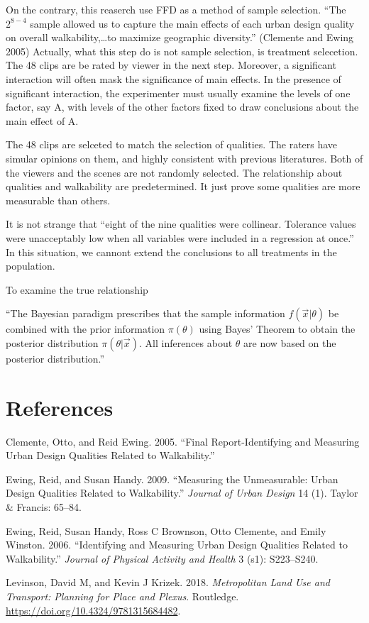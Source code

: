 \documentclass[12pt,]{article}
\begin{document}
On the contrary, this reaserch use FFD as a method of sample selection.
``The \(2^{8-4}\) sample allowed us to capture the main effects of each
urban design quality on overall walkability,\ldots{}to maximize
geographic diversity.'' (Clemente and Ewing 2005) Actually, what this
step do is not sample selection, is treatment selecetion. The 48 clips
are be rated by viewer in the next step. Moreover, a significant
interaction will often mask the significance of main effects. In the
presence of significant interaction, the experimenter must usually
examine the levels of one factor, say A, with levels of the other
factors fixed to draw conclusions about the main effect of A.

The 48 clips are selceted to match the selection of qualities. The
raters have simular opinions on them, and highly consistent with
previous literatures. Both of the viewers and the scenes are not
randomly selected. The relationship about qualities and walkability are
predetermined. It just prove some qualities are more measurable than
others.

It is not strange that ``eight of the nine qualities were collinear.
Tolerance values were unacceptably low when all variables were included
in a regression at once.'' In this situation, we cannont extend the
conclusions to all treatments in the population.

To examine the true relationship

``The Bayesian paradigm prescribes that the sample information
\(f(\vec x|\theta)\) be combined with the prior information
\(\pi(\theta)\) using Bayes' Theorem to obtain the posterior
distribution \(\pi(\theta|\vec x)\). All inferences about \(\theta\) are
now based on the posterior distribution.''

\hypertarget{references}{%
\section*{References}\label{references}}

\hypertarget{refs}{}
\leavevmode\hypertarget{ref-clemente2005identifying}{}%
Clemente, Otto, and Reid Ewing. 2005. ``Final Report-Identifying and
Measuring Urban Design Qualities Related to Walkability.''

\leavevmode\hypertarget{ref-ewing2009measuring}{}%
Ewing, Reid, and Susan Handy. 2009. ``Measuring the Unmeasurable: Urban
Design Qualities Related to Walkability.'' \emph{Journal of Urban
Design} 14 (1). Taylor \& Francis: 65--84.

\leavevmode\hypertarget{ref-ewing2006identifying}{}%
Ewing, Reid, Susan Handy, Ross C Brownson, Otto Clemente, and Emily
Winston. 2006. ``Identifying and Measuring Urban Design Qualities
Related to Walkability.'' \emph{Journal of Physical Activity and Health}
3 (s1): S223--S240.

\leavevmode\hypertarget{ref-levinson2018metropolitan}{}%
Levinson, David M, and Kevin J Krizek. 2018. \emph{Metropolitan Land Use
and Transport: Planning for Place and Plexus}. Routledge.
\url{https://doi.org/10.4324/9781315684482}.
\end{document}
